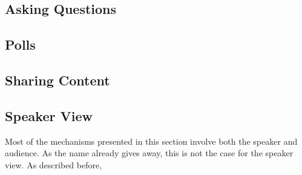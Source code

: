 \subsection{Asking Questions}

\subsection{Polls}

\subsection{Sharing Content}

\subsection{Speaker View}
Most of the mechanisms presented in this section involve both the speaker and audience. As the name already gives away, this is not the case for the speaker view. As described before, 